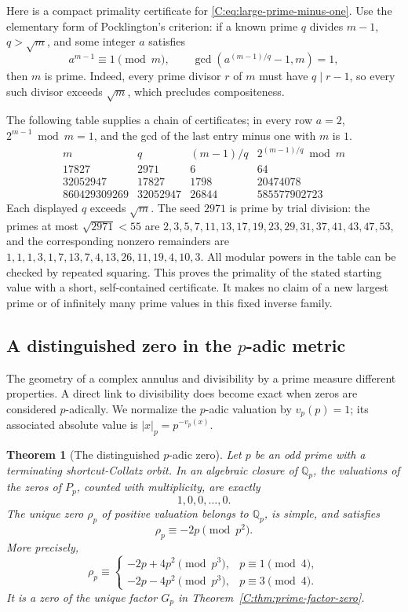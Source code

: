\documentclass[11pt,a4paper]{article}
\newtheorem{theorem}{Theorem}[section]
\theoremstyle{definition}
\theoremstyle{remark}
\numberwithin{equation}{section}
\begin{document}
Here is a compact primality certificate for \eqref{C:eq:large-prime-minus-one}.
Use the elementary form of Pocklington's criterion: if a known prime $q$
divides $m-1$, $q>\sqrt m$, and some integer $a$ satisfies
\[
 a^{m-1}\equiv1\pmod m,\qquad
 \gcd(a^{(m-1)/q}-1,m)=1,
\]
then $m$ is prime. Indeed, every prime divisor $r$ of $m$ must have
$q\mid r-1$, so every such divisor exceeds $\sqrt m$, which precludes
compositeness.

The following table supplies a chain of certificates; in every row
$a=2$, $2^{m-1}\bmod m=1$, and the gcd of the last entry minus one with
$m$ is $1$.
\[
\begin{array}{r|r|r|r}
m&q&(m-1)/q&2^{(m-1)/q}\bmod m\\\hline
17827&2971&6&64\\
32052947&17827&1798&20474078\\
860429309269&32052947&26844&585577902723
\end{array}
\]
Each displayed $q$ exceeds $\sqrt m$. The seed $2971$ is prime by trial
division: the primes at most $\sqrt{2971}<55$ are
$2,3,5,7,11,13,17,19,23,29,31,37,41,43,47,53$, and the corresponding
nonzero remainders are
$1,1,1,3,1,7,13,7,4,13,26,11,19,4,10,3$.
All modular powers in the table can be checked by repeated squaring.
This proves the primality of the stated starting value with a short,
self-contained certificate. It makes no claim of a new largest prime or
of infinitely many prime values in this fixed inverse family.

\subsection{A distinguished zero in the \texorpdfstring{$p$}{p}-adic metric}

The geometry of a complex annulus and divisibility by a prime measure
different properties. A direct link to divisibility does become exact
when zeros are considered $p$-adically. We normalize the $p$-adic valuation
by $v_p(p)=1$; its associated absolute value is
$|x|_p=p^{-v_p(x)}$.

\begin{theorem}[The distinguished $p$-adic zero]
\label{C:thm:distinguished-padic-zero}
Let $p$ be an odd prime with a terminating shortcut-Collatz orbit.
In an algebraic closure of $\mathbb Q_p$, the valuations of the zeros
of $P_p$, counted with multiplicity, are exactly
\[
 1,0,0,\ldots,0.
\]
The unique zero $\rho_p$ of positive valuation belongs to $\mathbb Q_p$,
is simple, and satisfies
\[
 \rho_p\equiv-2p\pmod{p^2}.
\]
More precisely,
\[
 \rho_p\equiv
 \begin{cases}
 -2p+4p^2\pmod{p^3},&p\equiv1\pmod4,\\
 -2p-4p^2\pmod{p^3},&p\equiv3\pmod4.
 \end{cases}
\]
It is a zero of the unique factor $G_p$ in
Theorem~\ref{C:thm:prime-factor-zero}.
\end{theorem}
\end{document}
